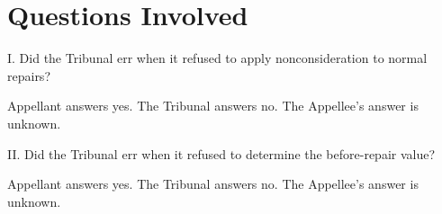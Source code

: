 \documentclass[12pt,\documentclassflag]{michiganCourtOfAppealsBrief}
\begin{document}






\newpage 
\section{Questions Involved} 


\noindent I. Did the Tribunal err when it refused to apply nonconsideration to normal repairs?

Appellant answers yes. The Tribunal answers no. The Appellee's answer is unknown. 
\vspace{\baselineskip}


\noindent II. Did the Tribunal err when it refused to determine the before-repair value?

Appellant answers yes. The Tribunal answers no. The Appellee's answer is unknown. 
\vspace{\baselineskip}
\end{document}
